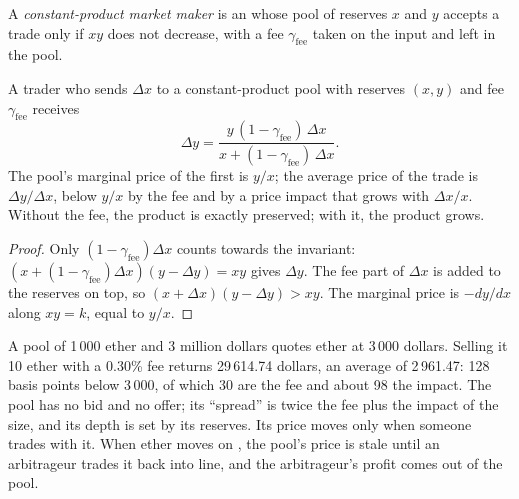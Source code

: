 \begin{definition}\label{def:m3:automated-market-makers:cp}
A \emph{constant-product market maker} is an  whose
pool of reserves $x$ and $y$ accepts a trade only if $xy$ does not decrease, with a fee $\gamma_{\mathrm{fee}}$ taken on
the input and left in the pool.
\end{definition}

\begin{proposition}\label{prop:m3:automated-market-makers:swap}
A trader who sends $\Delta x$ to a constant-product pool with reserves $(x, y)$ and fee $\gamma_{\mathrm{fee}}$ receives
\[
\Delta y = \frac{y\,(1 - \gamma_{\mathrm{fee}})\,\Delta x}{x + (1 - \gamma_{\mathrm{fee}})\,\Delta x}.
\]
The pool's marginal price of the first  is $y/x$; the average price of the trade is $\Delta y / \Delta x$, below
$y/x$ by the fee and by a price impact that grows with $\Delta x / x$. Without the fee, the product is exactly preserved;
with it, the product grows.
\end{proposition}

\begin{proof}
Only $(1 - \gamma_{\mathrm{fee}})\Delta x$ counts towards the invariant: $(x + (1 - \gamma_{\mathrm{fee}})\Delta x)(y - \Delta y) = xy$
gives $\Delta y$. The fee part of $\Delta x$ is added to the reserves on top, so $(x + \Delta x)(y - \Delta y) > xy$.
The marginal price is $-dy/dx$ along $xy = k$, equal to $y/x$.
\end{proof}

A pool of 1\,000 ether and 3 million dollars quotes ether at 3\,000 dollars. Selling it 10 ether with a 0.30\% fee returns
29\,614.74 dollars, an average of 2\,961.47: 128 basis points below 3\,000, of which 30 are the fee and about 98 the impact. The pool has no bid and no
offer; its ``spread'' is twice the fee plus the impact of the size, and its depth is set by its reserves. Its price moves
only when someone trades with it. When ether moves on , the pool's price is stale until an
arbitrageur trades it back into line, and the arbitrageur's profit comes out of the pool.


